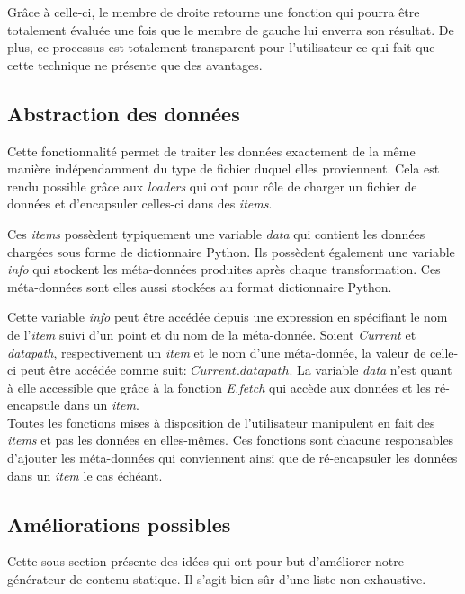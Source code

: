 		Grâce à celle-ci, le membre de droite retourne une fonction qui pourra être totalement évaluée une fois que le membre de gauche lui enverra son résultat. De plus, ce processus est totalement transparent pour l'utilisateur ce qui fait que cette technique ne présente que des avantages. 
	
	
	\subsection{Abstraction des données}
	
		Cette fonctionnalité permet de traiter les données exactement de la même manière indépendamment du type de fichier duquel elles proviennent. Cela est rendu possible grâce aux \textit{loaders} qui ont pour rôle de charger un fichier de données et d'encapsuler celles-ci dans des \textit{items}.
		
		Ces \textit{items} possèdent typiquement une variable \textit{data} qui contient les données chargées sous forme de dictionnaire Python. Ils possèdent également une variable \textit{info} qui stockent les méta-données produites après chaque transformation. Ces méta-données sont elles aussi stockées au format dictionnaire Python.
		
		Cette variable \textit{info} peut être accédée depuis une expression en spécifiant le nom de l'\textit{item} suivi d'un point et du nom de la méta-donnée. Soient \textit{Current} et \textit{datapath}, respectivement un \textit{item} et le nom d'une méta-donnée, la valeur de celle-ci peut être accédée comme suit: $Current.datapath$. La variable \textit{data} n'est quant à elle accessible que grâce à la fonction \textit{E.fetch} qui accède aux données et les ré-encapsule dans un \textit{item}.\\
		
		Toutes les fonctions mises à disposition de l'utilisateur manipulent en fait des \textit{items} et pas les données en elles-mêmes. Ces fonctions sont chacune responsables d'ajouter les méta-données qui conviennent ainsi que de ré-encapsuler les données dans un \textit{item} le cas échéant.
		
	\subsection{Améliorations possibles}
	
		Cette sous-section présente des idées qui ont pour but d'améliorer notre générateur de contenu statique. Il s'agit bien sûr d'une liste non-exhaustive.
		
